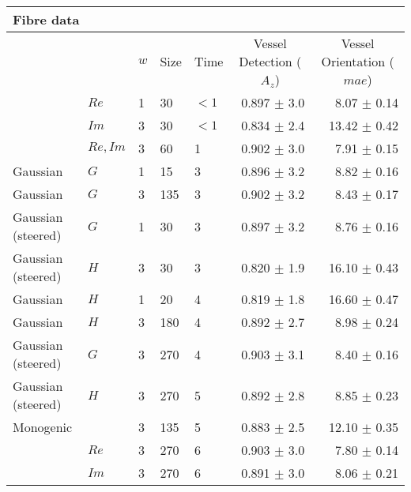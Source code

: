 \begin{tabularx}{\linewidth}{p{3cm} X X X X r r}
\toprule
\multicolumn{7}{l}{Fibre data} \\
\midrule
            &
            & $w$
            & Size
            & Time
            & \multicolumn{1}{c}{Vessel Detection \linebreak ($A_z$)}
            & \multicolumn{1}{c}{Vessel Orientation \linebreak ($mae$)}  \\

\midrule

\dtcwt{}& $Re$                      & 1 &    30 &${<}1$ & 0.897 $\pm$ 3.0   & 8.07 $\pm$ 0.14  \\
\dtcwt{}& $Im$                      & 3 &    30 &${<}1$ & 0.834 $\pm$ 2.4   &13.42 $\pm$ 0.42 \\
\dtcwt{}& $Re,Im$                   & 3 &    60 &   1   & 0.902 $\pm$ 3.0   & 7.91 $\pm$ 0.15 \\

Gaussian    & $G$                   & 1 &    15 &   3   & 0.896 $\pm$ 3.2   & 8.82 $\pm$ 0.16   \\
Gaussian    & $G$                   & 3 &   135 &   3   & 0.902 $\pm$ 3.2   & 8.43 $\pm$ 0.17 \\
Gaussian (steered)& $G$             & 1 &    30 &   3   & 0.897 $\pm$ 3.2   & 8.76 $\pm$ 0.16 \\
Gaussian (steered)& $H$             & 3 &    30 &   3   & 0.820 $\pm$ 1.9   &16.10 $\pm$ 0.43\\

Gaussian    & $H$                   & 1 &    20 &   4   & 0.819 $\pm$ 1.8   &16.60 $\pm$ 0.47  \\
Gaussian    & $H$                   & 3 &   180 &   4   & 0.892 $\pm$ 2.7   & 8.98 $\pm$ 0.24 \\
Gaussian (steered)& $G$             & 3 &   270 &   4   & 0.903 $\pm$ 3.1   & 8.40 $\pm$ 0.16 \\
Gaussian (steered)& $H$             & 3 &   270 &   5   & 0.892 $\pm$ 2.8   & 8.85 $\pm$ 0.23 \\

\multicolumn{2}{l}{Monogenic}       & 3 &   135 &   5   & 0.883 $\pm$ 2.5   &12.10 $\pm$ 0.35 \\

\dtcwt{}& $Re$                      & 3 &   270 &   6   & 0.903 $\pm$ 3.0   & 7.80 $\pm$ 0.14 \\
\dtcwt{}& $Im$                      & 3 &   270 &   6   & 0.891 $\pm$ 3.0   & 8.06 $\pm$ 0.21 \\


\end{tabularx}
